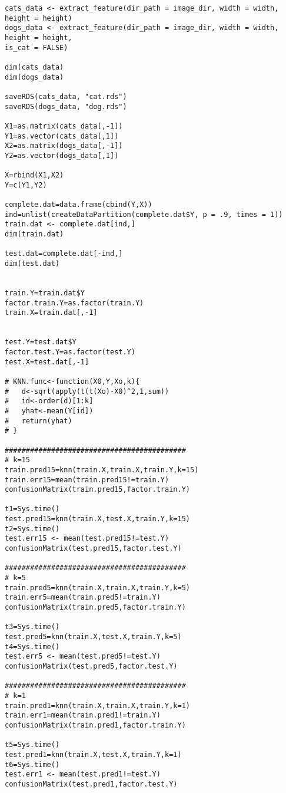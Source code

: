 \documentclass[12pt]{article}
\newcommand{\<}{\langle}
\renewcommand{\>}{\rangle}
\theoremstyle{definition}
\begin{document}
\begin{verbatim}
cats_data <- extract_feature(dir_path = image_dir, width = width, height = height)
dogs_data <- extract_feature(dir_path = image_dir, width = width, height = height,
is_cat = FALSE)

dim(cats_data)
dim(dogs_data)

saveRDS(cats_data, "cat.rds")
saveRDS(dogs_data, "dog.rds")

X1=as.matrix(cats_data[,-1])
Y1=as.vector(cats_data[,1])
X2=as.matrix(dogs_data[,-1])
Y2=as.vector(dogs_data[,1])

X=rbind(X1,X2)
Y=c(Y1,Y2)

complete.dat=data.frame(cbind(Y,X))
ind=unlist(createDataPartition(complete.dat$Y, p = .9, times = 1))
train.dat <- complete.dat[ind,]
dim(train.dat)

test.dat=complete.dat[-ind,]
dim(test.dat)


train.Y=train.dat$Y
factor.train.Y=as.factor(train.Y)
train.X=train.dat[,-1]


test.Y=test.dat$Y
factor.test.Y=as.factor(test.Y)
test.X=test.dat[,-1]

# KNN.func<-function(X0,Y,Xo,k){
#   d<-sqrt(apply(t(t(Xo)-X0)^2,1,sum))
#   id<-order(d)[1:k]
#   yhat<-mean(Y[id])
#   return(yhat)
# }

###########################################
# k=15
train.pred15=knn(train.X,train.X,train.Y,k=15)
train.err15=mean(train.pred15!=train.Y)
confusionMatrix(train.pred15,factor.train.Y)

t1=Sys.time()
test.pred15=knn(train.X,test.X,train.Y,k=15)
t2=Sys.time()
test.err15 <- mean(test.pred15!=test.Y)
confusionMatrix(test.pred15,factor.test.Y)

###########################################
# k=5
train.pred5=knn(train.X,train.X,train.Y,k=5)
train.err5=mean(train.pred5!=train.Y)
confusionMatrix(train.pred5,factor.train.Y)

t3=Sys.time()
test.pred5=knn(train.X,test.X,train.Y,k=5)
t4=Sys.time()
test.err5 <- mean(test.pred5!=test.Y)
confusionMatrix(test.pred5,factor.test.Y)

###########################################
# k=1
train.pred1=knn(train.X,train.X,train.Y,k=1)
train.err1=mean(train.pred1!=train.Y)
confusionMatrix(train.pred1,factor.train.Y)

t5=Sys.time()
test.pred1=knn(train.X,test.X,train.Y,k=1)
t6=Sys.time()
test.err1 <- mean(test.pred1!=test.Y)
confusionMatrix(test.pred1,factor.test.Y)
\end{verbatim}
\end{document}
